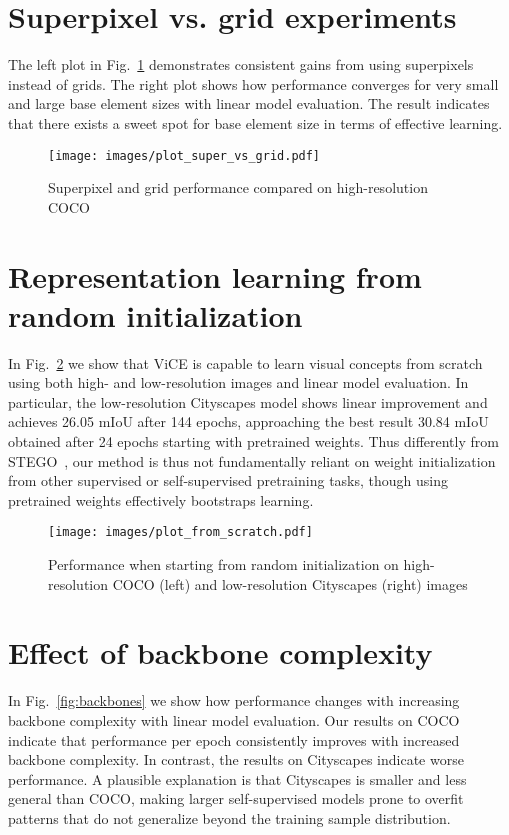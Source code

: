 \documentclass{bmvc2k}
\begin{document}
\section{Superpixel vs. grid experiments}

The left plot in Fig.~\ref{fig:super_vs_grid} demonstrates consistent gains from using superpixels instead of grids. The right plot shows how performance converges for very small and large base element sizes with linear model evaluation. The result indicates that there exists a sweet spot for base element size in terms of effective learning.

\begin{figure}
\centering
\texttt{[image: images/plot\_super\_vs\_grid.pdf]}
\caption{Superpixel and grid performance compared on high-resolution COCO}
\label{fig:super_vs_grid}
\end{figure}


\section{Representation learning from random initialization}

In Fig.~\ref{fig:from_scratch} we show that ViCE is capable to learn visual concepts from scratch using both high- and low-resolution images and linear model evaluation. In particular, the low-resolution Cityscapes model shows linear improvement and achieves 26.05 mIoU after 144 epochs, approaching the best result 30.84 mIoU obtained after 24 epochs starting with pretrained weights. Thus differently from STEGO~\cite{Hamilton2022STEGO}, our method is thus not fundamentally reliant on weight initialization from other supervised or self-supervised pretraining tasks, though using pretrained weights effectively bootstraps learning.

\begin{figure}
\centering
\texttt{[image: images/plot\_from\_scratch.pdf]}
\caption{Performance when starting from random initialization on high-resolution COCO (left) and low-resolution Cityscapes (right) images}
\label{fig:from_scratch}
\end{figure}

\section{Effect of backbone complexity}

In Fig.~\ref{fig:backbones} we show how performance changes with increasing backbone complexity with linear model evaluation. Our results on COCO indicate that performance per epoch consistently improves with increased backbone complexity. In contrast, the results on Cityscapes indicate worse performance. A plausible explanation is that Cityscapes is smaller and less general than COCO, making larger self-supervised models prone to overfit patterns that do not generalize beyond the training sample distribution.
\end{document}
